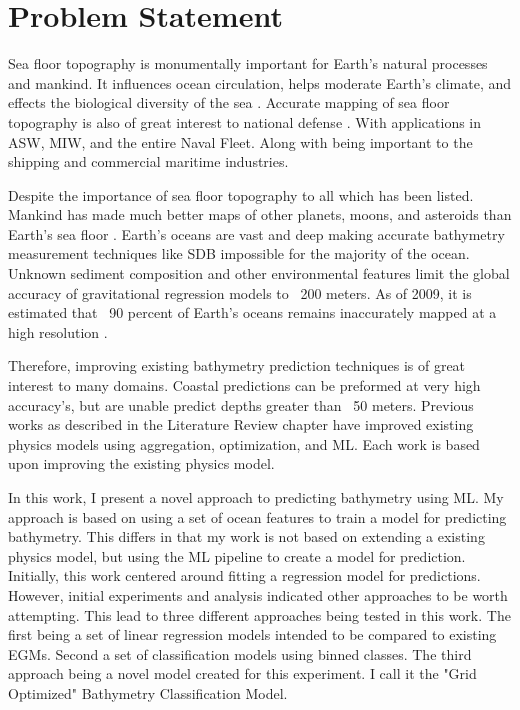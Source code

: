 \section{Problem Statement}
\setlength{\parindent}{10ex}

Sea floor topography is monumentally important for Earth's natural processes and mankind.
It influences ocean circulation, helps moderate Earth's climate, and effects the biological diversity of the sea \cite{kunze2004role}.
Accurate mapping of sea floor topography is also of great interest to national defense \cite{goodman1982defence}.
With applications in \ac{ASW}, \ac{MIW}, and the entire Naval Fleet.
Along with being important to the shipping and commercial maritime industries.

\par
Despite the importance of sea floor topography to all which has been listed.
Mankind has made much better maps of other planets, moons, and asteroids than Earth's sea floor \cite{becker2009global}.
Earth's oceans are vast and deep making accurate bathymetry measurement techniques like \ac{SDB} impossible for the majority of the ocean.
Unknown sediment composition and other environmental features limit the global accuracy of gravitational regression models to ~200 meters.
As of 2009, it is estimated that ~90 percent of Earth's oceans remains inaccurately mapped at a high resolution \cite{becker2009global}.

\par
Therefore, improving existing bathymetry prediction techniques is of great interest to many domains.
Coastal predictions can be preformed at very high accuracy's, but are unable predict depths greater than ~50 meters.
Previous works as described in the Literature Review chapter have improved existing physics models using aggregation, optimization, and \ac{ML}.
Each work is based upon improving the existing physics model.

\par
In this work, I present a novel approach to predicting bathymetry using \ac{ML}.
My approach is based on using a set of ocean features to train a model for predicting bathymetry.
This differs in that my work is not based on extending a existing physics model, but using the \ac{ML} pipeline to create a model for prediction.
Initially, this work centered around fitting a regression model for predictions.
However, initial experiments and analysis indicated other approaches to be worth attempting.
This lead to three different approaches being tested in this work.
The first being a set of linear regression models intended to be compared to existing \ac{EGM}s.
Second a set of classification models using binned classes.
The third approach being a novel model created for this experiment.
I call it the "Grid Optimized" Bathymetry Classification Model.